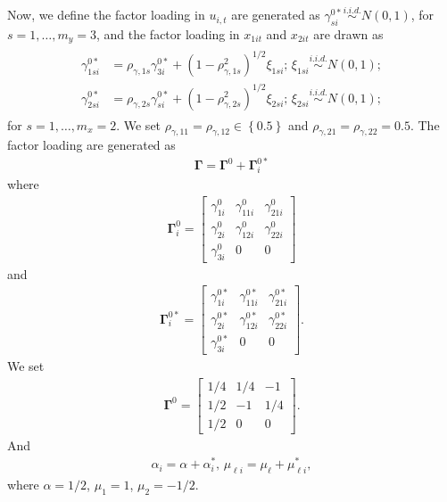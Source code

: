 \documentclass[12pt,a4paper,hyperref]{article}
\begin{document}
Now, we define the factor loading in $u_{i,t}$ are generated as $\gamma^{0\ast}_{si}\overset{i.i.d.}{\sim}N\left(0, 1 \right)$, for $s=1,\ldots, m_{y}=3$, and the factor loading in $x_{1it}$ and $x_{2it}$ are drawn as
\begin{align}
\begin{split}
\gamma^{0\ast}_{1si}&=\rho_{\gamma,1s} \gamma^{0\ast}_{3i}+\left(1-\rho^{2}_{\gamma,1s}  \right)^{1/2}\xi_{1si};\,\xi_{1si}\overset{i.i.d.}{\sim}N\left(0, 1 \right); \\
\gamma^{0\ast}_{2si}&=\rho_{\gamma,2s} \gamma^{0\ast}_{si}+\left(1-\rho^{2}_{\gamma,2s}  \right)^{1/2}\xi_{2si};\,\xi_{2si}\overset{i.i.d.}{\sim}N\left(0, 1 \right);
\end{split}
\end{align}
for $s=1,\ldots, m_{x}=2$. We set $\rho_{\gamma, 11}=\rho_{\gamma, 12} \in \left\{ 0.5 \right\}$ and $\rho_{\gamma, 21}=\rho_{\gamma, 22}=0.5.$
The factor loading are generated as
\begin{align}
\boldsymbol{\Gamma}=\boldsymbol{\Gamma}^{0}+\boldsymbol{\Gamma}^{0\ast}_{i}
\end{align}
where
\begin{align}
\boldsymbol{\Gamma}^{0}_{i}=
\begin{bmatrix}
\gamma^{0}_{1i} & \gamma^{0}_{11i} & \gamma^{0}_{21i} \\
\gamma^{0}_{2i} & \gamma^{0}_{12i} & \gamma^{0}_{22i} \\
\gamma^{0}_{3i} &  0               &     0
\end{bmatrix}
\end{align}
and
\begin{align}
\boldsymbol{\Gamma}^{0\ast}_{i}=
\begin{bmatrix}
\gamma^{0\ast}_{1i} & \gamma^{0\ast}_{11i} & \gamma^{0\ast}_{21i} \\
\gamma^{0\ast}_{2i} & \gamma^{0\ast}_{12i} & \gamma^{0\ast}_{22i} \\
\gamma^{0\ast}_{3i} &  0               &     0
\end{bmatrix}.
\end{align}
We set
\begin{align}
\boldsymbol{\Gamma}^{0}=
\begin{bmatrix}
1/4 & 1/4 & -1 \\
1/2 & -1  & 1/4 \\
1/2 & 0   & 0
\end{bmatrix} .
\end{align}
And
\begin{align}
\alpha_{i}=\alpha+ \alpha^{\ast}_{i}, \, \mu_{\ell i}= \mu_{\ell}+\mu^{\ast}_{\ell i},
\end{align}
where $\alpha=1/2$, $\mu_{1}=1$, $\mu_{2}=-1/2$.
\end{document}
